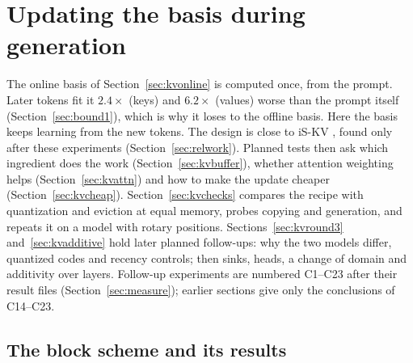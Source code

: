 \documentclass[10pt]{article}
\theoremstyle{plain}
\theoremstyle{definition}
\theoremstyle{remark}
\begin{document}

\section{Updating the basis during generation}
\label{sec:kvupdate}

The online basis of Section~\ref{sec:kvonline} is computed once, from the prompt. Later tokens fit it $2.4\times$ (keys) and $6.2\times$ (values) worse than the prompt itself (Section~\ref{sec:bound1}), which is why it loses to the offline basis. Here the basis keeps learning from the new tokens. The design is close to iS-KV \cite{iskv2026}, found only after these experiments (Section~\ref{sec:relwork}). Planned tests then ask which ingredient does the work (Section~\ref{sec:kvbuffer}), whether attention weighting helps (Section~\ref{sec:kvattn}) and how to make the update cheaper (Section~\ref{sec:kvcheap}). Section~\ref{sec:kvchecks} compares the recipe with quantization and eviction at equal memory, probes copying and generation, and repeats it on a model with rotary positions. Sections~\ref{sec:kvround3} and~\ref{sec:kvadditive} hold later planned follow-ups: why the two models differ, quantized codes and recency controls; then sinks, heads, a change of domain and additivity over layers. Follow-up experiments are numbered C1--C23 after their result files (Section~\ref{sec:measure}); earlier sections give only the conclusions of C14--C23.

\subsection{The block scheme and its results}
\label{sec:blockscheme}
\end{document}
